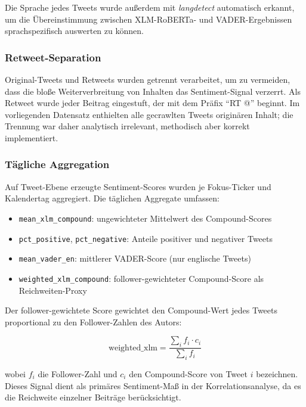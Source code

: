 Die Sprache jedes Tweets wurde außerdem mit \textit{langdetect} automatisch erkannt, um die Übereinstimmung zwischen XLM-RoBERTa- und VADER-Ergebnissen sprachspezifisch auswerten zu können.

\subsubsection*{Retweet-Separation}

Original-Tweets und Retweets wurden getrennt verarbeitet, um zu vermeiden, dass die bloße Weiterverbreitung von Inhalten das Sentiment-Signal verzerrt. Als Retweet wurde jeder Beitrag eingestuft, der mit dem Präfix \enquote{RT @} beginnt. Im vorliegenden Datensatz enthielten alle gecrawlten Tweets originären Inhalt; die Trennung war daher analytisch irrelevant, methodisch aber korrekt implementiert.

\subsubsection*{Tägliche Aggregation}

Auf Tweet-Ebene erzeugte Sentiment-Scores wurden je Fokus-Ticker und Kalendertag aggregiert. Die täglichen Aggregate umfassen:

\begin{itemize}[noitemsep]
\item \texttt{mean\_xlm\_compound}: ungewichteter Mittelwert des Compound-Scores
\item \texttt{pct\_positive}, \texttt{pct\_negative}: Anteile positiver und negativer Tweets
\item \texttt{mean\_vader\_en}: mittlerer VADER-Score (nur englische Tweets)
\item \texttt{weighted\_xlm\_compound}: follower-gewichteter Compound-Score als Reichweiten-Proxy
\end{itemize}

Der follower-gewichtete Score gewichtet den Compound-Wert jedes Tweets proportional zu den Follower-Zahlen des Autors:

\begin{equation}
\text{weighted\_xlm} = \frac{\sum_{i} f_i \cdot c_i}{\sum_{i} f_i}
\label{eq:weighted_compound}
\end{equation}

wobei $f_i$ die Follower-Zahl und $c_i$ den Compound-Score von Tweet $i$ bezeichnen. Dieses Signal dient als primäres Sentiment-Maß in der Korrelationsanalyse, da es die Reichweite einzelner Beiträge berücksichtigt.


